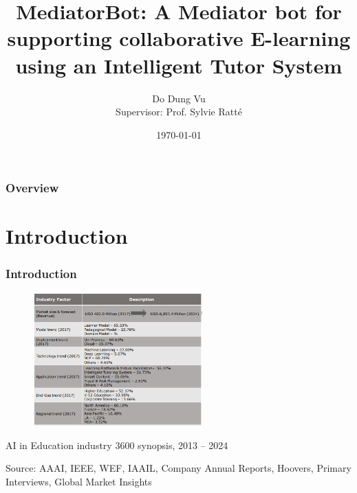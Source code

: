\documentclass{beamer}
\title[Laboratoire d'ingénierie cognitive et sémantique (LinCS)]{MediatorBot: A Mediator bot for supporting collaborative E-learning using an Intelligent Tutor System} %
\author{Do Dung Vu \\ Supervisor: Prof. Sylvie Ratt\'e} %
\institute[ETS] %
{
Département de génie logiciel et des TI \\ %
\medskip
\textit{do-dung.vu.1@ens.etsmtl.ca } %
}
\date{\today} %
\begin{document}
\begin{frame}
\titlepage %
\end{frame}

\begin{frame}
\frametitle{Overview} %
\tableofcontents %
\end{frame}


\section{Introduction} %
\begin{frame}
\frametitle{Introduction}

\begin{center}
	

		\begin{figure}
			\includegraphics[width=65mm]{market2.png}
				
			
		\end{figure}
{\footnotesize 	AI in Education industry 3600 synopsis, 2013 – 2024}
	
{\tiny Source: AAAI, IEEE, WEF, IAAIL, Company Annual Reports, Hoovers, Primary Interviews, Global Market Insights}
\end{center}




\end{frame}
\end{document}
